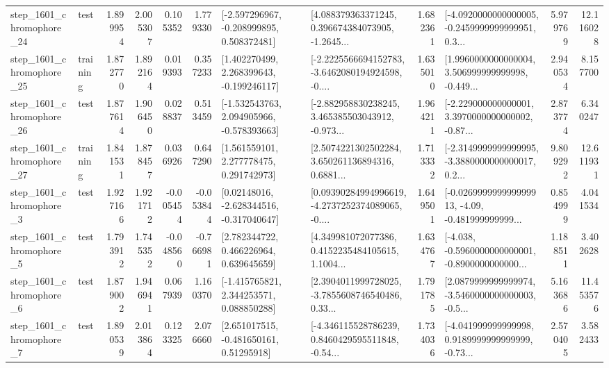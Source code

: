 \begin{tabular}{llrrrrllrlrr}
 step\_1601\_chromophore\_24 &      test &      1.899954 &    2.005307 &      0.105352 &  1.779330 &   [-2.597296967, -0.208999895, 0.508372481] &  [4.088379363371245, 0.396674384073905, -1.2645... &       1.682361 &  [-4.0920000000000005, -0.2459999999999951, 0.3... &            5.979769 &         12.116028 \\
 step\_1601\_chromophore\_25 &  training &      1.872770 &    1.892164 &      0.019393 &  0.357233 &    [1.402270499, 2.268399643, -0.199246117] &  [-2.2225566694152783, -3.6462080194924598, -0.... &       1.635010 &  [1.9960000000000004, 3.506999999999998, -0.449... &            2.940534 &          8.157700 \\
 step\_1601\_chromophore\_26 &      test &      1.877614 &    1.906450 &      0.028837 &  0.513459 &   [-1.532543763, 2.094905966, -0.578393663] &  [-2.882958830238245, 3.465385503043912, -0.973... &       1.964211 &  [-2.229000000000001, 3.3970000000000002, -0.87... &            2.873774 &          6.340247 \\
 step\_1601\_chromophore\_27 &  training &      1.841531 &    1.878457 &      0.036926 &  0.647290 &     [1.561559101, 2.277778475, 0.291742973] &  [2.5074221302502284, 3.650261136894316, 0.6881... &       1.713332 &  [-2.3149999999999995, -3.3880000000000017, 0.2... &            9.809292 &         12.611931 \\
  step\_1601\_chromophore\_3 &      test &      1.927166 &    1.921712 &     -0.005454 & -0.053844 &    [0.02148016, -2.628344516, -0.317040647] &  [0.09390284994996619, -4.2737252374089065, -0.... &       1.649501 &  [-0.026999999999999913, -4.09, -0.481999999999... &            0.854999 &          4.041534 \\
  step\_1601\_chromophore\_5 &      test &      1.793912 &    1.745352 &     -0.048560 & -0.766981 &     [2.782344722, 0.466226964, 0.639645659] &  [4.349981072077386, 0.4152235484105615, 1.1004... &       1.634767 &  [-4.038, -0.5960000000000001, -0.8900000000000... &            1.188511 &          3.402628 \\
  step\_1601\_chromophore\_6 &      test &      1.879002 &    1.946941 &      0.067939 &  1.160370 &    [-1.415765821, 2.344253571, 0.088850288] &  [2.3904011999728025, -3.7855608746540486, 0.33... &       1.791785 &  [2.0879999999999974, -3.5460000000000003, -0.5... &            5.163686 &         11.453576 \\
  step\_1601\_chromophore\_7 &      test &      1.890539 &    2.013864 &      0.123325 &  2.076660 &     [2.651017515, -0.481650161, 0.51295918] &  [-4.346115528786239, 0.8460429595511848, -0.54... &       1.734036 &  [-4.041999999999998, 0.9189999999999999, -0.73... &            2.570405 &          3.582433 \\

\end{tabular}
